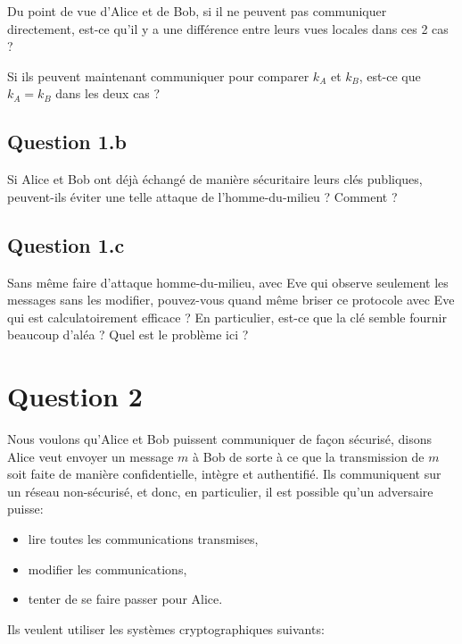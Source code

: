 \documentclass[12pt]{article}
\begin{document}
Du point de vue d'Alice et de Bob, si il ne peuvent pas communiquer directement, est-ce qu'il y a une différence entre leurs vues locales dans ces 2 cas ?

Si ils peuvent maintenant communiquer pour comparer $k_A$ et $k_B$, est-ce que $k_A = k_B$ dans les deux cas ?



\subsection{Question 1.b}

Si Alice et Bob ont déjà échangé de manière sécuritaire leurs clés publiques, peuvent-ils éviter une telle attaque de l'homme-du-milieu ? Comment ?



\subsection{Question 1.c}


Sans même faire d'attaque homme-du-milieu, avec Eve qui observe seulement les messages sans les modifier, pouvez-vous quand même briser ce protocole avec Eve qui est calculatoirement efficace ? En particulier, est-ce que la clé semble fournir beaucoup d'aléa ? Quel est le problème ici ?



\section{Question 2}

Nous voulons qu'Alice et Bob puissent communiquer de façon sécurisé, disons Alice veut envoyer un message $m$ à Bob de sorte à ce que la transmission de $m$ soit faite de manière confidentielle, intègre et authentifié.
Ils communiquent sur un réseau non-sécurisé, et donc, en particulier, il est possible qu'un adversaire puisse:
\begin{itemize}
	\item lire toutes les communications transmises,
	\item modifier les communications,
	\item tenter de se faire passer pour Alice.
\end{itemize}

Ils veulent utiliser les systèmes cryptographiques suivants:
\end{document}
